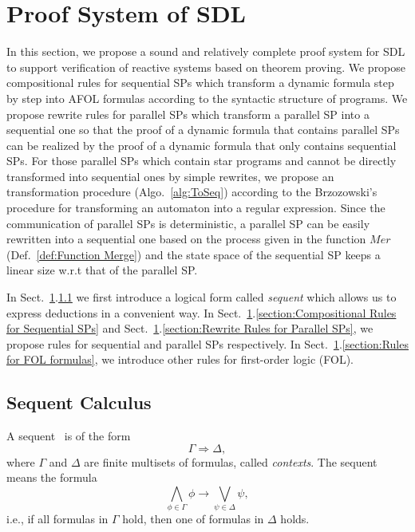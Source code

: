 \documentclass{fcs}
\newcommand{\Merge}[0]{\mathit{Mer}}
\newcommand{\seqArrow}[0]{\Rightarrow}
\begin{document}
\section{Proof System of SDL}
\label{section:Proof System of SDL}
In this section, we propose a sound and relatively complete proof system for SDL to support verification of reactive systems based on theorem proving.
We propose compositional rules for sequential SPs which transform a dynamic formula step by step into AFOL formulas according to the syntactic structure of programs.
We propose rewrite rules for parallel SPs which transform a parallel SP into a sequential one so that the proof of a dynamic formula that contains parallel SPs can be realized by the proof of a dynamic formula that only contains sequential SPs.
For those parallel SPs which contain star programs and cannot be directly transformed into sequential ones by simple rewrites, we propose an transformation procedure (Algo.~\ref{alg:ToSeq}) according to the Brzozowski's procedure for
transforming an automaton into a regular expression.
Since the communication of parallel SPs is deterministic, a parallel SP can be easily rewritten into a sequential one based on the process given in the function $\Merge$ (Def.~\ref{def:Function Merge}) and
the state space of the sequential SP keeps a linear size w.r.t that of the parallel SP.

In Sect.~\ref{section:Proof System of SDL}.\ref{section:Sequent Calculus} we first introduce a logical form called \emph{sequent} which allows us to express deductions in a convenient way.
In Sect.~\ref{section:Proof System of SDL}.\ref{section:Compositional Rules for Sequential SPs} and Sect.~\ref{section:Proof System of SDL}.\ref{section:Rewrite Rules for Parallel SPs}, we propose rules for sequential and parallel SPs respectively.
In Sect.~\ref{section:Proof System of SDL}.\ref{section:Rules for FOL formulas}, we introduce other rules for first-order logic (FOL).

\subsection{Sequent Calculus}
\label{section:Sequent Calculus}

A sequent~\cite{Gentzen34} is of the form
$$\Gamma \seqArrow \Delta, $$
where $\Gamma$ and $\Delta$ are finite multisets of formulas, called \emph{contexts}.
The sequent means the formula
$$\bigwedge_{\phi\in \Gamma} \phi \to \bigvee_{\psi\in \Delta}\psi,$$
i.e., if all formulas in $\Gamma$ hold, then one of formulas in $\Delta$ holds.
\end{document}
